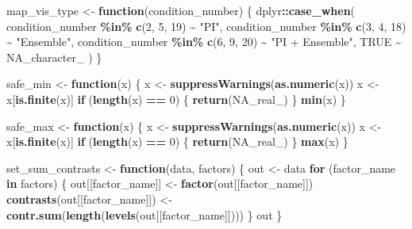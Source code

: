 \documentclass[
]{article}
\newenvironment{Shaded}{\begin{snugshade}}{\end{snugshade}}
\newcommand{\ConstantTok}[1]{\textcolor[rgb]{0.56,0.35,0.01}{#1}}
\newcommand{\ControlFlowTok}[1]{\textcolor[rgb]{0.13,0.29,0.53}{\textbf{#1}}}
\newcommand{\DecValTok}[1]{\textcolor[rgb]{0.00,0.00,0.81}{#1}}
\newcommand{\FunctionTok}[1]{\textcolor[rgb]{0.13,0.29,0.53}{\textbf{#1}}}
\newcommand{\NormalTok}[1]{#1}
\newcommand{\OtherTok}[1]{\textcolor[rgb]{0.56,0.35,0.01}{#1}}
\newcommand{\SpecialCharTok}[1]{\textcolor[rgb]{0.81,0.36,0.00}{\textbf{#1}}}
\newcommand{\StringTok}[1]{\textcolor[rgb]{0.31,0.60,0.02}{#1}}
\begin{document}
\begin{Shaded}
\begin{Highlighting}[]
\NormalTok{map\_vis\_type }\OtherTok{\textless{}{-}} \ControlFlowTok{function}\NormalTok{(condition\_number) \{}
\NormalTok{  dplyr}\SpecialCharTok{::}\FunctionTok{case\_when}\NormalTok{(}
\NormalTok{    condition\_number }\SpecialCharTok{\%in\%} \FunctionTok{c}\NormalTok{(}\DecValTok{2}\NormalTok{, }\DecValTok{5}\NormalTok{, }\DecValTok{19}\NormalTok{) }\SpecialCharTok{\textasciitilde{}} \StringTok{"PI"}\NormalTok{,}
\NormalTok{    condition\_number }\SpecialCharTok{\%in\%} \FunctionTok{c}\NormalTok{(}\DecValTok{3}\NormalTok{, }\DecValTok{4}\NormalTok{, }\DecValTok{18}\NormalTok{) }\SpecialCharTok{\textasciitilde{}} \StringTok{"Ensemble"}\NormalTok{,}
\NormalTok{    condition\_number }\SpecialCharTok{\%in\%} \FunctionTok{c}\NormalTok{(}\DecValTok{6}\NormalTok{, }\DecValTok{9}\NormalTok{, }\DecValTok{20}\NormalTok{) }\SpecialCharTok{\textasciitilde{}} \StringTok{"PI + Ensemble"}\NormalTok{,}
    \ConstantTok{TRUE} \SpecialCharTok{\textasciitilde{}} \ConstantTok{NA\_character\_}
\NormalTok{  )}
\NormalTok{\}}

\NormalTok{safe\_min }\OtherTok{\textless{}{-}} \ControlFlowTok{function}\NormalTok{(x) \{}
\NormalTok{  x }\OtherTok{\textless{}{-}} \FunctionTok{suppressWarnings}\NormalTok{(}\FunctionTok{as.numeric}\NormalTok{(x))}
\NormalTok{  x }\OtherTok{\textless{}{-}}\NormalTok{ x[}\FunctionTok{is.finite}\NormalTok{(x)]}
  \ControlFlowTok{if}\NormalTok{ (}\FunctionTok{length}\NormalTok{(x) }\SpecialCharTok{==} \DecValTok{0}\NormalTok{) \{}
    \FunctionTok{return}\NormalTok{(}\ConstantTok{NA\_real\_}\NormalTok{)}
\NormalTok{  \}}
  \FunctionTok{min}\NormalTok{(x)}
\NormalTok{\}}

\NormalTok{safe\_max }\OtherTok{\textless{}{-}} \ControlFlowTok{function}\NormalTok{(x) \{}
\NormalTok{  x }\OtherTok{\textless{}{-}} \FunctionTok{suppressWarnings}\NormalTok{(}\FunctionTok{as.numeric}\NormalTok{(x))}
\NormalTok{  x }\OtherTok{\textless{}{-}}\NormalTok{ x[}\FunctionTok{is.finite}\NormalTok{(x)]}
  \ControlFlowTok{if}\NormalTok{ (}\FunctionTok{length}\NormalTok{(x) }\SpecialCharTok{==} \DecValTok{0}\NormalTok{) \{}
    \FunctionTok{return}\NormalTok{(}\ConstantTok{NA\_real\_}\NormalTok{)}
\NormalTok{  \}}
  \FunctionTok{max}\NormalTok{(x)}
\NormalTok{\}}

\NormalTok{set\_sum\_contrasts }\OtherTok{\textless{}{-}} \ControlFlowTok{function}\NormalTok{(data, factors) \{}
\NormalTok{  out }\OtherTok{\textless{}{-}}\NormalTok{ data}
  \ControlFlowTok{for}\NormalTok{ (factor\_name }\ControlFlowTok{in}\NormalTok{ factors) \{}
\NormalTok{    out[[factor\_name]] }\OtherTok{\textless{}{-}} \FunctionTok{factor}\NormalTok{(out[[factor\_name]])}
    \FunctionTok{contrasts}\NormalTok{(out[[factor\_name]]) }\OtherTok{\textless{}{-}} \FunctionTok{contr.sum}\NormalTok{(}\FunctionTok{length}\NormalTok{(}\FunctionTok{levels}\NormalTok{(out[[factor\_name]])))}
\NormalTok{  \}}
\NormalTok{  out}
\NormalTok{\}}


\end{Highlighting}
\end{Shaded}
\end{document}
